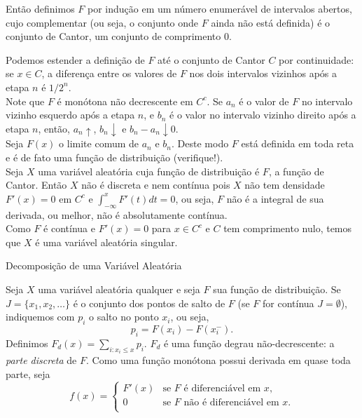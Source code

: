 \begin{frame}
\begin{block}{}
%
%
Então definimos $F$ por indução em um número enumerável de intervalos abertos, cujo complementar (ou seja, o conjunto onde $F$ ainda não está definida) é o conjunto de Cantor, um conjunto de comprimento 0.
 
\medskip
Podemos estender a definição de $F$ até o conjunto de Cantor $C$ por continuidade: se $x\in C$, a diferença entre os valores de $F$ nos dois intervalos vizinhos após a etapa $n$ é $1/2^n$.\\ 

\medskip
Note que $F$ é monótona não decrescente em $C^c$. Se $a_n$ é o valor de $F$ no intervalo vizinho esquerdo após a etapa $n$, e $b_n$ é o valor no intervalo vizinho direito após a etapa $n$, então, $a_n\uparrow$, $b_n\downarrow$ e $b_n-a_n\downarrow 0$. \\

\medskip
Seja $F(x)$ o limite comum de $a_n$ e $b_n$. Deste modo $F$ está definida em toda reta e é de fato uma função de distribuição (verifique!).\\

\medskip
Seja $X$ uma variável aleatória cuja função de distribuição é $F$, a função de Cantor. Então $X$ não é discreta e nem contínua pois $X$ não tem densidade $F'(x)=0$ em $C^c$ e $\int_{-\infty}^{x}F'(t)dt=0$, ou seja, $F$ não é a integral de sua derivada, ou melhor, não é absolutamente contínua. \\

\medskip
Como $F$ é contínua e $F'(x)=0$ para $x\in C^c$ e $C$ tem comprimento nulo, temos que $X$ é uma variável aleatória singular.

\end{block}
\end{frame}
%
\begin{frame}
\begin{block}{Decomposição de uma Variável Aleatória}

Seja $X$ uma variável aleatória qualquer e seja $F$ sua função de distribuição. Se $J=\{x_1,x_2,\ldots\}$ é o conjunto dos pontos de salto de $F$ (se $F$ for contínua $J=\emptyset$), indiquemos com $p_i$ o salto no ponto $x_i$, ou seja,
$$p_i=F(x_i)-F(x_i^-).$$
Definimos $F_d(x)=\sum_{i:x_i\leq x}p_i.$ $F_d$ é uma função degrau não-decrescente: a {\em parte discreta} de $F$. Como uma função monótona possui derivada em quase toda parte, seja
%
\[
f(x)= \left\{
\begin{array}{ll}
F'(x) & \mbox{se $F$ é diferenciável em $x$,} \\
0 & \mbox{se $F$ não é diferenciável em $x$.}\\
\end{array}
\right.
\]

\end{block}
\end{frame}


